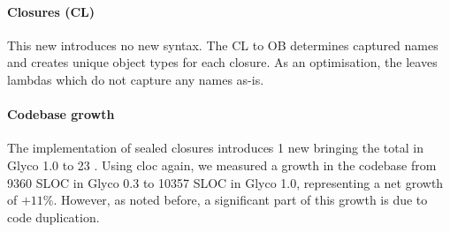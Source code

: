 \documentclass[main.tex]{subfiles}
\begin{document}
\paragraph{Closures (CL)} This new  introduces no new syntax. The CL to OB  determines captured names and creates unique object types for each closure. As an optimisation, the  leaves lambdas which do not capture any names as-is.

\paragraph{Codebase growth} The implementation of sealed closures introduces 1 new  bringing the total in Glyco 1.0 to 23 . Using cloc again, we measured a growth in the codebase from 9360 SLOC in Glyco 0.3 to 10357 SLOC in Glyco 1.0, representing a net growth of $+11\%$. However, as noted before, a significant part of this growth is due to code duplication.

\onlyinsubfile{\glsaddall\printglossaries}
\end{document}
